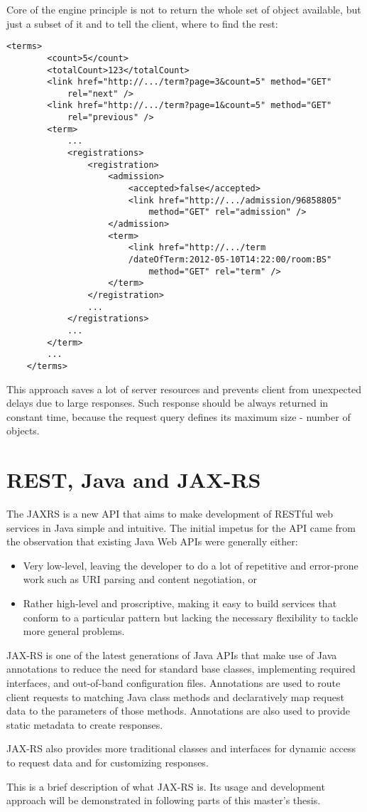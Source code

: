 	Core of the engine principle is not to return the whole set of object available, but just a subset of it and to
	tell the client, where to find the rest:
	
	\begin{lstlisting}[tabsize=2]
	<terms>
		<count>5</count>
		<totalCount>123</totalCount>
		<link href="http://.../term?page=3&count=5" method="GET" 
			rel="next" />
		<link href="http://.../term?page=1&count=5" method="GET" 
			rel="previous" />
		<term>
			...
			<registrations>
				<registration>
					<admission>
						<accepted>false</accepted>
						<link href="http://.../admission/96858805" 
							method="GET" rel="admission" />
					</admission>
					<term>
						<link href="http://.../term
						/dateOfTerm:2012-05-10T14:22:00/room:BS"
							method="GET" rel="term" />
					</term>
				</registration>
				...
			</registrations>
			...
		</term>
		...
	</terms>
	\end{lstlisting}
	
	This approach saves a lot of server resources and prevents client from unexpected delays due to large responses. Such
	response should be always returned in constant time, because the request query defines its maximum size - number of
	objects.
	
	\section{REST, Java and JAX-RS}\label{sec:jaxrs}
	
	\cite[p.~xiii]{restful} The \gls{JAXRS} is a new API that aims to make development of RESTful web services in Java
	simple and intuitive. The initial impetus for the API came from the observation that existing Java Web APIs were
	generally either:
	\begin{itemize}
	  \item Very low-level, leaving the developer to do a lot of repetitive and error-prone work such as URI parsing and
	  content negotiation, or
	  \item Rather high-level and proscriptive, making it easy to build services that conform to a particular pattern but
	  lacking the necessary flexibility to tackle more general problems. 
	\end{itemize}

	JAX-RS is one of the latest generations of Java APIs that make use of Java annotations to reduce the need for standard
	base classes, implementing required interfaces, and out-of-band configuration files. Annotations are used to route
	client requests to matching Java class methods and declaratively map request data to the parameters of those methods.
	Annotations are also used to provide static metadata to create responses.
	
	JAX-RS also provides more traditional classes and interfaces for dynamic access to request data and for customizing
	responses.
	
	This is a brief description of what JAX-RS is. Its usage and development approach will be demonstrated in following
	parts of this master's thesis.
